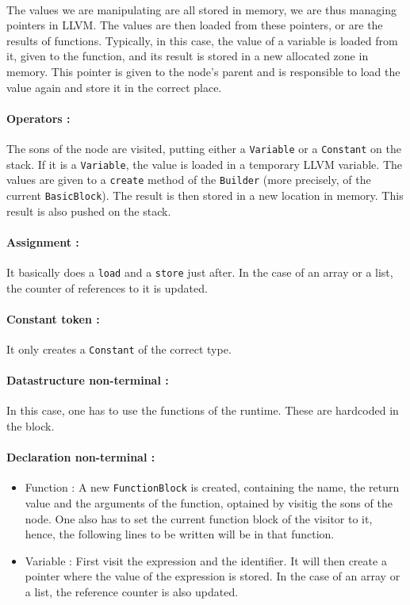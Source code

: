 \documentclass[a4paper,11pt]{article}
\begin{document}
\paragraph{}

The values we are manipulating are all stored in memory, we are thus managing pointers in LLVM. The values are then loaded from these pointers, or are the results of functions. Typically, in this case, the value of a variable is loaded from it, given to the function, and its result is stored in a new allocated zone in memory. This pointer is given to the node's parent and is responsible to load the value again and store it in the correct place.

\paragraph{Operators :} The sons of the node are visited, putting either a \texttt{Variable} or a \texttt{Constant} on the stack. If it is a \texttt{Variable}, the value is loaded in a temporary LLVM variable. The values are given to a \texttt{create} method of the \texttt{Builder} (more precisely, of the current \texttt{BasicBlock}). The result is then stored in a new location in memory. This result is also pushed on the stack.

\paragraph{Assignment :} It basically does a \texttt{load} and a \texttt{store} just after. In the case of an array or a list, the counter of references to it is updated.

\paragraph{Constant token :} It only creates a \texttt{Constant} of the correct type.

\paragraph{Datastructure non-terminal :} In this case, one has to use the functions of the runtime. These are hardcoded in the block.

\paragraph{Declaration non-terminal :}
\begin{itemize}
	\item Function : A new \texttt{FunctionBlock} is created, containing the name, the return value and the arguments of the function, optained by visitig the sons of the node. One also has to set the current function block of the visitor to it, hence, the following lines to be written will be in that function.
	\item Variable : First visit the expression and the identifier. It will then create a pointer where the value of the expression is stored. In the case of an array or a list, the reference counter is also updated.
\end{itemize}
\end{document}
